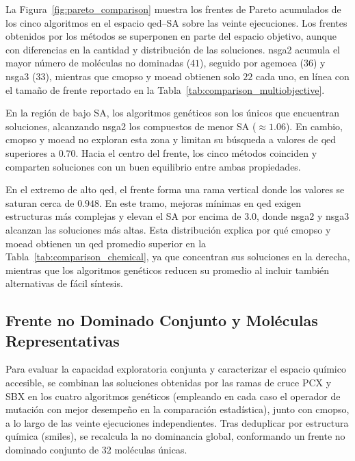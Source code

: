 La Figura~\ref{fig:pareto_comparison} muestra los frentes de Pareto acumulados de los cinco algoritmos en el espacio \gls{qed}--SA sobre las veinte ejecuciones. Los frentes obtenidos por los métodos se superponen en parte del espacio objetivo, aunque con diferencias en la cantidad y distribución de las soluciones. \acrshort{nsga2} acumula el mayor número de moléculas no dominadas ($41$), seguido por \acrshort{agemoea} ($36$) y \acrshort{nsga3} ($33$), mientras que \acrshort{cmopso} y \acrshort{moead} obtienen solo $22$ cada uno, en línea con el tamaño de frente reportado en la Tabla~\ref{tab:comparison_multiobjective}.

En la región de bajo SA, los algoritmos genéticos son los únicos que encuentran soluciones, alcanzando \acrshort{nsga2} los compuestos de menor SA ($\approx 1.06$). En cambio, \acrshort{cmopso} y \acrshort{moead} no exploran esta zona y limitan su búsqueda a valores de \gls{qed} superiores a $0.70$. Hacia el centro del frente, los cinco métodos coinciden y comparten soluciones con un buen equilibrio entre ambas propiedades.

En el extremo de alto \gls{qed}, el frente forma una rama vertical donde los valores se saturan cerca de $0.948$. En este tramo, mejoras mínimas en \gls{qed} exigen estructuras más complejas y elevan el SA por encima de $3.0$, donde \acrshort{nsga2} y \acrshort{nsga3} alcanzan las soluciones más altas. Esta distribución explica por qué \acrshort{cmopso} y \acrshort{moead} obtienen un \gls{qed} promedio superior en la Tabla~\ref{tab:comparison_chemical}, ya que concentran sus soluciones en la derecha, mientras que los algoritmos genéticos reducen su promedio al incluir también alternativas de fácil síntesis.



\subsection{Frente no Dominado Conjunto y Moléculas Representativas}
\label{subsec:frente_conjunto_global}

Para evaluar la capacidad exploratoria conjunta y caracterizar el espacio químico accesible, se combinan las soluciones obtenidas por las ramas de cruce PCX y SBX en los cuatro algoritmos genéticos (empleando en cada caso el operador de mutación con mejor desempeño en la comparación estadística), junto con \acrshort{cmopso}, a lo largo de las veinte ejecuciones independientes. Tras deduplicar por estructura química (\gls{smiles}), se recalcula la no dominancia global, conformando un frente no dominado conjunto de 32 moléculas únicas.

